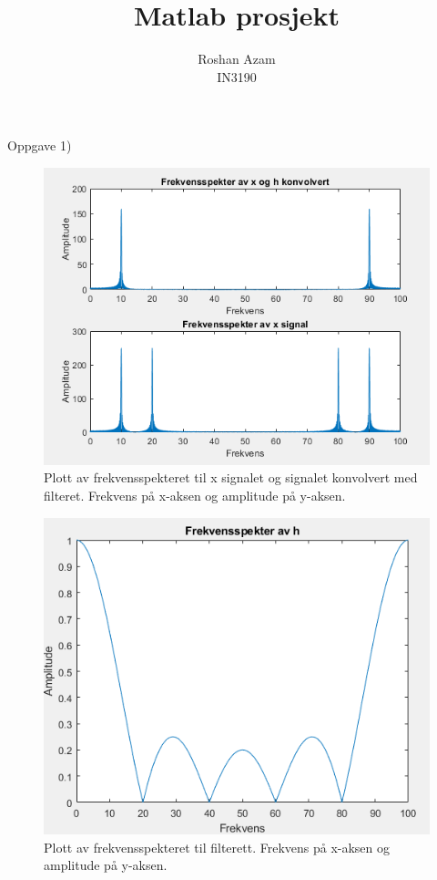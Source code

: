 \documentclass[11pt]{article}
\begin{document}
\title{
  Matlab prosjekt}
\author{\small Roshan Azam\\ IN3190}
\maketitle

Oppgave 1)

\begin{figure}[H]
\includegraphics[scale=0.9]{1c_xh.png}
\caption{Plott av frekvensspekteret til x signalet og signalet konvolvert med filteret. Frekvens på x-aksen og amplitude på y-aksen. }
\end{figure}

\begin{figure}[H]
\includegraphics[scale=0.9]{1c_hfrek.png}
\caption{Plott av frekvensspekteret til filterett. Frekvens på x-aksen og amplitude på y-aksen.}
\end{figure}
\end{document}
